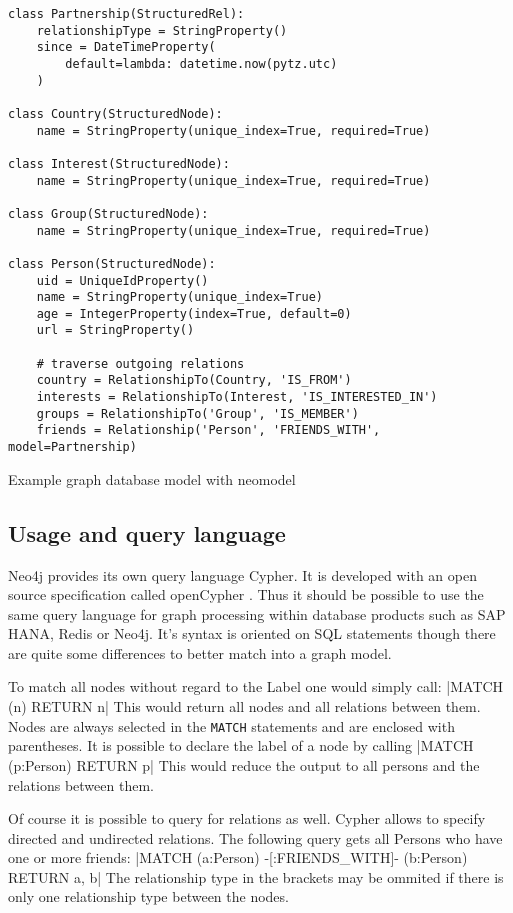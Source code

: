 \begin{listing}[ht]
\begin{verbatim}
class Partnership(StructuredRel):
    relationshipType = StringProperty()
    since = DateTimeProperty(
        default=lambda: datetime.now(pytz.utc)
    )

class Country(StructuredNode):
    name = StringProperty(unique_index=True, required=True)

class Interest(StructuredNode):
    name = StringProperty(unique_index=True, required=True)

class Group(StructuredNode):
    name = StringProperty(unique_index=True, required=True)

class Person(StructuredNode):
    uid = UniqueIdProperty()
    name = StringProperty(unique_index=True)
    age = IntegerProperty(index=True, default=0)
    url = StringProperty()

    # traverse outgoing relations
    country = RelationshipTo(Country, 'IS_FROM')
    interests = RelationshipTo(Interest, 'IS_INTERESTED_IN')
    groups = RelationshipTo('Group', 'IS_MEMBER')
    friends = Relationship('Person', 'FRIENDS_WITH', model=Partnership)
\end{verbatim}
\caption{Example graph database model with neomodel}
\label{lst:graphdb:neomodel}
\end{listing}

\subsection{Usage and query language}
\label{sec:graphdb:cypher}
Neo4j provides its own query language Cypher. It is developed with an open source specification called openCypher \cite{openCypher}.
Thus it should be possible to use the same query language for graph processing within database products such as SAP HANA, Redis or Neo4j.
It's syntax is oriented on SQL statements though there are quite some differences to better match into a graph model.

To match all nodes without regard to the Label one would simply call: |MATCH (n) RETURN n|
This would return all nodes and all relations between them.
Nodes are always selected in the \texttt{MATCH} statements and are enclosed with parentheses.
It is possible to declare the label of a node by calling |MATCH (p:Person) RETURN p|
This would reduce the output to all persons and the relations between them.

Of course it is possible to query for relations as well.
Cypher allows to specify directed and undirected relations.
The following query gets all Persons who have one or more friends: |MATCH (a:Person) -[:FRIENDS_WITH]- (b:Person) RETURN a, b|
The relationship type in the brackets may be ommited if there is only one relationship type between the nodes.

